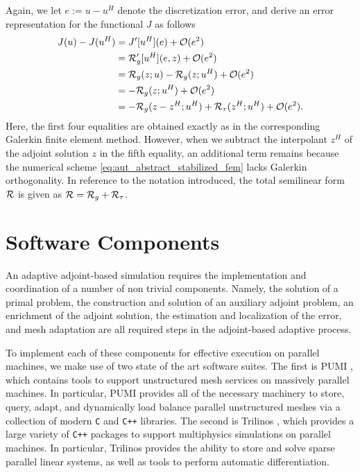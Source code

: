 Again, we let $e := u - u^H$ denote the discretization error, and derive
an error representation for the functional $J$ as follows
%
\begin{gather}
\begin{aligned}
J(u) - J(u^H) &= J'[u^H](e) + \mathcal{O}(e^2) \\
&= \mathcal{R}_g'[u^H](e, z) + \mathcal{O}(e^2) \\
&= \mathcal{R}_g(z; u) - \mathcal{R}_g(z; u^H) + \mathcal{O}(e^2) \\
&= - \mathcal{R}_g(z; u^H) + \mathcal{O}(e^2) \\
&= - \mathcal{R}_g(z - z^H; u^H) + \mathcal{R}_{\tau}(z^H; u^H) + \mathcal{O}(e^2).
\end{aligned}
\label{eq:aut_abstract_stabilized_error}
\end{gather}
%
Here, the first four equalities are obtained exactly as in the corresponding
Galerkin finite element method. However, when we subtract the interpolant
$z^H$ of the adjoint solution $z$ in the fifth equality, an additional term
remains because the numerical scheme \eqref{eq:aut_abstract_stabilized_fem}
lacks Galerkin orthogonality. In reference to the notation
introduced, the total semilinear form $\mathcal{R}$ is given as
$\mathcal{R} = \mathcal{R}_g + \mathcal{R}_{\tau}$.

\section{Software Components}

An adaptive adjoint-based simulation
requires the implementation and coordination of a number of
non trivial components. Namely, the solution of a primal problem,
the construction and solution of an auxiliary adjoint problem, an enrichment
of the adjoint solution, the estimation and localization of the error,
and mesh adaptation are all required steps in the adjoint-based
adaptive process.

To implement each of these components for effective execution on parallel
machines, we make use of two state of the art software suites. The first
is PUMI \cite{ibanez2016pumi}, which contains tools to
support unstructured mesh services on massively parallel machines. In
particular, PUMI provides all of the necessary machinery to store, query,
adapt, and dynamically load balance parallel unstructured meshes via
a collection of modern \texttt{C} and \texttt{C++} libraries. The second
is Trilinos \cite{heroux2005overview, heroux2012new}, which provides a
large variety of \texttt{C++} packages to support multiphysics
simulations on parallel machines. In particular, Trilinos provides
the ability to store and solve sparse parallel linear systems, as
well as tools to perform automatic differentiation.

